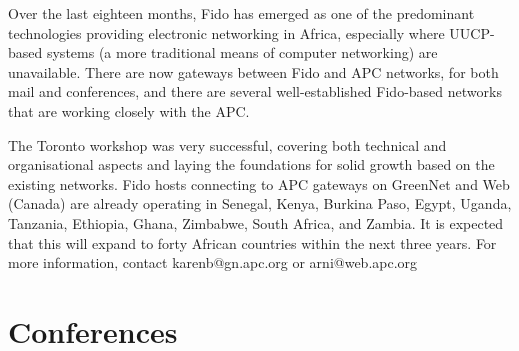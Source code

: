 Over the last eighteen months, Fido has emerged as one of the
predominant technologies providing electronic networking in Africa,
especially where UUCP-based systems (a more traditional means of
computer networking) are unavailable.  There are now gateways between
Fido and APC networks, for both mail and conferences, and there are several
well-established Fido-based networks that are working closely
with the APC.

The Toronto workshop was very successful, covering both technical and
organisational aspects and laying the foundations for solid growth based
on the existing networks.  Fido hosts connecting to APC gateways on
GreenNet and Web (Canada) are already operating in Senegal, Kenya,
Burkina Paso, Egypt, Uganda, Tanzania, Ethiopia, Ghana, Zimbabwe, South
Africa, and Zambia.  It is expected that this will expand to forty
African countries within the next three years.  For more information,
contact karenb@gn.apc.org or arni@web.apc.org

\section{Conferences}
